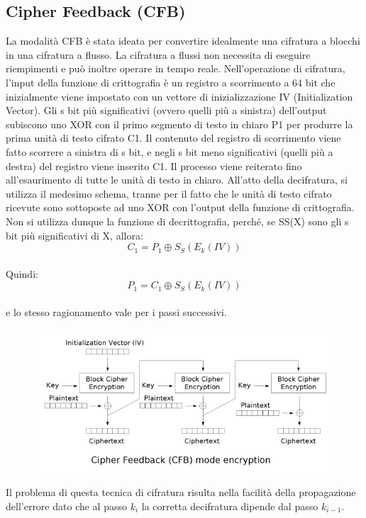 \documentclass[10pt,a4paper]{article}
\begin{document}
\subsection{Cipher Feedback (CFB)}
La modalità CFB è stata ideata per convertire idealmente una cifratura a blocchi in una cifratura a flusso. La cifratura a flussi non necessita di eseguire riempimenti e può inoltre operare in tempo reale.
Nell'operazione di cifratura, l'input della funzione di crittografia è un registro a scorrimento a 64 bit che inizialmente viene impostato con un vettore di inizializzazione IV (Initialization Vector). Gli s bit più significativi (ovvero quelli più a sinistra) dell'output subiscono uno XOR con il primo segmento di testo in chiaro P1 per produrre la prima unità di testo cifrato C1. Il contenuto del registro di scorrimento viene fatto scorrere a sinistra di s bit, e negli s bit meno significativi (quelli più a destra) del registro viene inserito C1. Il processo viene reiterato fino all'esaurimento di tutte le unità di testo in chiaro.
All'atto della decifratura, si utilizza il medesimo schema, tranne per il fatto che le unità di testo cifrato ricevute sono sottoposte ad uno XOR con l'output della funzione di crittografia. Non si utilizza dunque la funzione di decrittografia, perché, se SS(X) sono gli s bit più significativi di X, allora:
$$ C_1 = P_1 \oplus S_S(E_k(IV)) $$\\
Quindi:\\
$$ P_1 = C_1 \oplus S_S(E_k(IV)) $$\\
e lo stesso ragionamento vale per i passi successivi.


\begin{figure}[htbp]
\includegraphics[scale=0.8]{immagini/cfb.png}
\end{figure}

Il problema di questa tecnica di cifratura risulta nella facilità della propagazione dell'errore dato che al passo $k_i$ la corretta decifratura dipende dal passo $k_{i-1}$.
\end{document}
